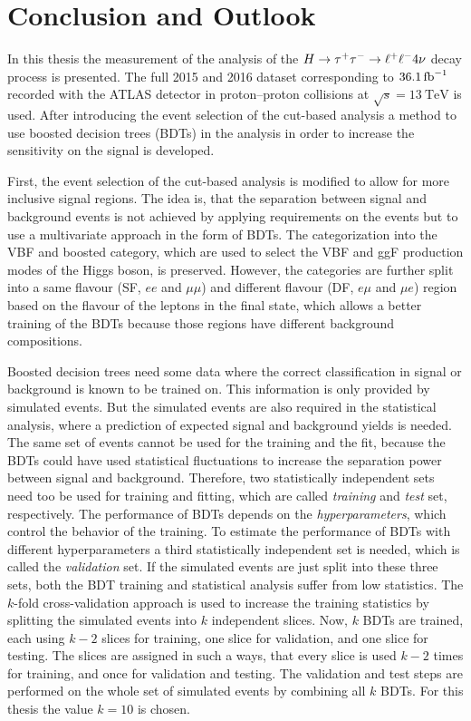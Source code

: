\chapter{Conclusion and Outlook}\label{cha:conclusion}

In this thesis the measurement of the analysis of the $H \to \tau^+\tau^- \to \ell^+\ell^- 4\nu$ decay process is presented.
The full 2015 and 2016 dataset corresponding to $\SI{36.1}{\invfb}$ recorded with the ATLAS detector
in proton--proton collisions at $\sqrt{s} = \SI{13}{\TeV}$ is used.
After introducing the event selection of the cut-based analysis
a method to use boosted decision trees (BDTs) in the analysis in order to increase the sensitivity on the signal
is developed.

First, the event selection of the cut-based analysis is modified to allow for more inclusive signal regions.
The idea is, that the separation between signal and background events is not achieved by applying requirements on the
events but to use a multivariate approach in the form of BDTs.
The categorization into the VBF and boosted category, which are used to select the VBF and ggF production modes
of the Higgs boson, is preserved.
However, the categories are further split into a same flavour (SF, $ee$ and $\mu\mu$) and different flavour (DF, $e\mu$ and $\mu e$)
region based on the flavour of the leptons in the final state,
which allows a better training of the BDTs because those regions have different background compositions.

Boosted decision trees need some data where the correct classification in signal or background is known to be trained on.
This information is only provided by simulated events.
But the simulated events are also required in the statistical analysis, where a prediction of expected signal and background
yields is needed.
The same set of events cannot be used for the training and the fit, because the BDTs could have used statistical fluctuations
to increase the separation power between signal and background.
Therefore, two statistically independent sets need too be used for training and fitting, which are called \emph{training} and \emph{test} set, respectively.
The performance of BDTs depends on the \emph{hyperparameters}, which control the behavior of the training.
To estimate the performance of BDTs with different hyperparameters a third statistically independent set is needed, which is called the \emph{validation}
set.
If the simulated events are just split into these three sets, both the BDT training and statistical analysis suffer from
low statistics.
The $k$-fold cross-validation approach is used to increase the training statistics by splitting the simulated events
into $k$ independent slices.
Now, $k$ BDTs are trained, each using $k-2$ slices for training, one slice for validation, and one slice for testing.
The slices are assigned in such a ways, that every slice is used $k-2$ times for training, and once for validation and testing.
The validation and test steps are performed on the whole set of simulated events by combining all $k$ BDTs.
For this thesis the value $k=10$ is chosen.

